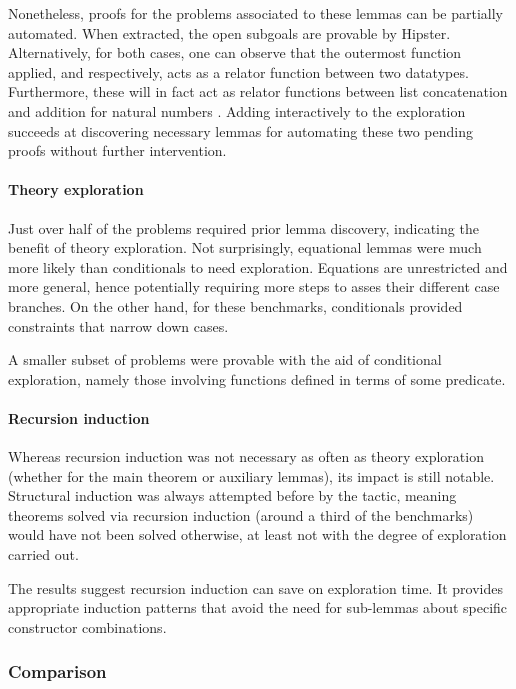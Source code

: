 Nonetheless, proofs for the problems associated to these lemmas can be partially automated.
%
When extracted, the open subgoals are provable by Hipster.
%
Alternatively, for both cases, one can observe that the outermost function applied,  and  respectively, acts as a relator function between two datatypes.
%
Furthermore, these will in fact act as relator functions between list concatenation  and addition for natural numbers .
%
Adding interactively  to the exploration succeeds at discovering necessary lemmas for automating these two pending proofs without further intervention.


\paragraph{Theory exploration}

Just over half of the problems required prior lemma discovery, indicating the benefit of theory exploration.
%
Not surprisingly, equational lemmas were much more likely than conditionals to need exploration.
%
Equations are unrestricted and more general, hence potentially requiring more steps to asses their different case branches.
%
On the other hand, for these benchmarks, conditionals provided constraints that narrow down cases.

A smaller subset of problems were provable with the aid of conditional exploration, namely those involving functions defined in terms of some predicate.

\paragraph{Recursion induction}

Whereas recursion induction was not necessary as often as theory exploration (whether for the main theorem or auxiliary lemmas), its impact is still notable.
%
Structural induction was always attempted before by the tactic, meaning theorems solved via recursion induction (around a third of the benchmarks) would have not been solved otherwise, at least not with the degree of exploration carried out.
 
The results suggest recursion induction can save on exploration time.
%
It provides appropriate induction patterns that avoid the need for sub-lemmas about specific constructor combinations.


\subsubsection{Comparison}


